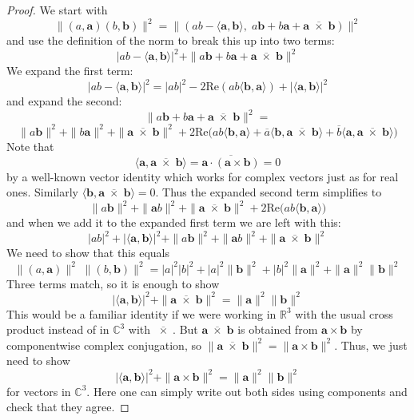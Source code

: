 \documentclass{article}
\theoremstyle{plain}
\theoremstyle{remark}
\theoremstyle{definition}
\newcommand{\R}{{\mathbb R}}  %
\newcommand{\C}{{\mathbb C}}  %
\begin{document}
\begin{proof}
We start with
\[ \|(a, \mathbf{a})(b, \mathbf{b})\|^2 = \|(a b - \langle \mathbf{a}, \mathbf{b}\rangle , \; a \mathbf{b} + b \mathbf{a} + \mathbf{a} \; \overline{\!\times\!} \; \mathbf{b}) \|^2 \]
and use the definition of the norm to break this up into two terms:
\[ |a b - \langle \mathbf{a}, \mathbf{b} \rangle|^2 + \| a \mathbf{b} + b \mathbf{a}  + \mathbf{a} \; \overline{\!\times\!} \; \mathbf{b} \|^2 \]
We expand the first term:
\[  |a b - \langle \mathbf{a}, \mathbf{b} \rangle|^2 = |a b|^2 - 2 \mathrm{Re}(a b \langle \mathbf{b} , \mathbf{a} \rangle) + |\langle \mathbf{a}, \mathbf{b}\rangle|^2 \]
and expand the second:
\[ \|a \mathbf{b} + b \mathbf{a} + \mathbf{a} \; \overline{\!\times\!} \; \mathbf{b} \|^2 = \]
\[ \| a \mathbf{b} \|^2 + \|b \mathbf{a}\|^2 + \|\mathbf{a} \; \overline{\!\times\!} \; \mathbf{b}\|^2 + 
 2 \mathrm{Re} \big(a b \langle \mathbf{b}, \mathbf{a} \rangle  + 
\overline{a} \langle \mathbf{b}, \mathbf{a} \; \overline{\!\times\!} \; \mathbf{b} \rangle +
\overline{b} \langle \mathbf{a}, \mathbf{a} \; \overline{\!\times\!} \; \mathbf{b} \rangle  \big) \]
Note that
\[  \langle \mathbf{a}, \mathbf{a} \; \overline{\!\times\!} \; \mathbf{b} \rangle = \overline{\mathbf{a} \cdot (\mathbf{a} \times \mathbf{b})} = 0 \]
by a well-known vector identity which works for complex vectors just as for real ones.  Similarly $\langle \mathbf{b}, \mathbf{a} \; \overline{\!\times\!} \; \mathbf{b} \rangle = 0$.  Thus the expanded second term simplifies to
\[ \| a \mathbf{b} \|^2 + \|\mathbf{a} b\|^2 + \|\mathbf{a} \; \overline{\!\times\!} \; \mathbf{b}\|^2 + 
 2 \mathrm{Re} \big(a b \langle \mathbf{b}, \mathbf{a} \rangle \big) \]
and when we add it to the expanded first term we are left with this:
\[  |a b|^2 + |\langle \mathbf{a}, \mathbf{b}\rangle|^2 + 
 \| a \mathbf{b} \|^2 + \|\mathbf{a} b\|^2 + \|\mathbf{a} \; \overline{\!\times\!} \; \mathbf{b}\|^2 \]
We need to show that this equals
\[ 
 \|(a,\mathbf{a})\|^2 \; \|(b,\mathbf{b})\|^2 = |a|^2 |b|^2 + |a|^2 \|\mathbf{b}\|^2 + |b|^2 \|\mathbf{a}\|^2 + \|\mathbf{a}\|^2 \|\mathbf{b}\|^2 
\]
Three terms match, so it is enough to show
\[ |\langle \mathbf{a}, \mathbf{b}\rangle|^2 +  \|\mathbf{a} \; \overline{\!\times\!} \; \mathbf{b}\|^2 =  \|\mathbf{a}\|^2 \|\mathbf{b}\|^2 \]
This would be a familiar identity if we were working in $\R^3$ with the usual cross product instead of in $\C^3$ with $\; \overline{\!\times\!} \;$.   But $\mathbf{a} \; \overline{\!\times\!} \; \mathbf{b}$ is obtained from $\mathbf{a} \times \mathbf{b}$ by componentwise complex conjugation, so $\|\mathbf{a} \; \overline{\!\times\!} \; \mathbf{b}\|^2 =  \|\mathbf{a} \times \mathbf{b}\|^2$.  Thus, we just need to show
\[ |\langle \mathbf{a}, \mathbf{b}\rangle|^2 +  \|\mathbf{a} \times \mathbf{b}\|^2 =  \|\mathbf{a}\|^2 \|\mathbf{b}\|^2 \]
for vectors in $\C^3$.  Here one can simply write out both sides using components and check that they agree.   \end{proof}
\end{document}

